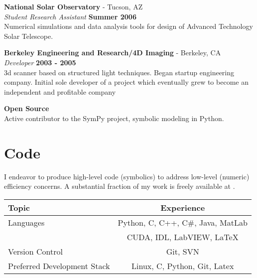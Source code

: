 \documentclass[margin,line]{res}
\begin{document}
\begin{resume}
{\bf National Solar Observatory} - Tucson, AZ\\
{\em Student Research Assistant} \hfill {\bf Summer 2006}\\
Numerical simulations and data analysis tools for design of Advanced Technology Solar Telescope.

{\bf Berkeley Engineering and Research/4D Imaging} - Berkeley, CA\\
{\em Developer} \hfill {\bf 2003 - 2005}\\
3d scanner based on structured light techniques. Began startup engineering company. Initial sole developer of a project which eventually grew to become an independent and profitable company

{\bf Open Source }\\
Active contributor to the SymPy project, symbolic modeling in Python.

\section{\sc Code}

I endeavor to produce high-level code (symbolics) to address low-level (numeric) efficiency concerns. A substantial fraction of my work is freely available at .

\begin{center}
\begin{tabular}{|l | c| }
\hline
Topic  & Experience  \\
\hline
\hline
Languages & Python, C,  C++, C\#, Java, MatLab \\
&  CUDA, IDL, LabVIEW, LaTeX \\ 
\hline
Version Control & Git, SVN \\
\hline
Preferred Development Stack & Linux, C, Python, Git, Latex\\
\hline
\end{tabular}
\end{center}

\end{resume}
\end{document}
